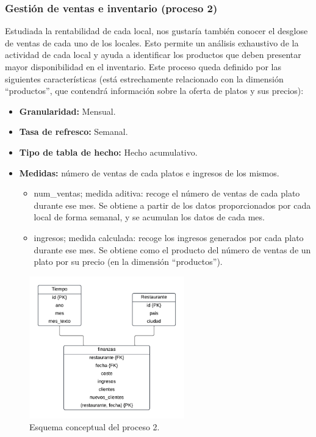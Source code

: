 \documentclass[12pt]{opticajnl}
\begin{document}
\subsubsection{Gestión de ventas e inventario (proceso 2)}

Estudiada la rentabilidad de cada local, nos gustaría también conocer el desglose de ventas de cada uno de los locales. Esto permite un análisis exhaustivo de la actividad de cada local y ayuda a identificar los productos que deben presentar mayor disponibilidad en el inventario. Este proceso queda definido por las siguientes características (está estrechamente relacionado con la dimensión ``productos'', que contendrá información sobre la oferta de platos y sus precios):
\begin{itemize}
\item \textbf{Granularidad:} Mensual.
\item \textbf{Tasa de refresco:} Semanal.
\item \textbf{Tipo de tabla de hecho:} Hecho acumulativo.
\item \textbf{Medidas:} número de ventas de cada platos e ingresos de los mismos.
\begin{itemize}
\item num\_ventas; medida aditiva: recoge el número de ventas de cada plato durante ese mes. Se obtiene a partir de los datos proporcionados por cada local de forma semanal, y se acumulan los datos de cada mes.
\item ingresos; medida calculada: recoge los ingresos generados por cada plato durante ese mes. Se obtiene como el producto del número de ventas de un plato por su precio (en la dimensión ``productos'').
\end{itemize}
\end{itemize}

\begin{figure}[h]
\centering
\includegraphics[width=0.6\textwidth]{fotos/prods.pdf}
\caption{Esquema conceptual del proceso 2.}
\label{fig:esquema_proceso2}
\end{figure}
\end{document}
